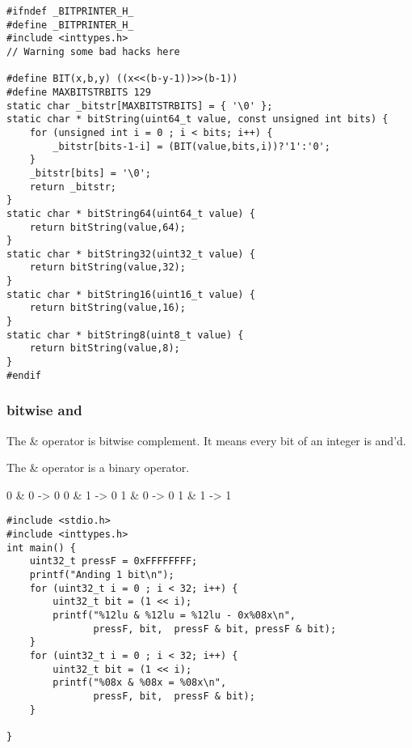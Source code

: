 \documentclass[11pt]{article}
\begin{document}
\begin{verbatim}
#ifndef _BITPRINTER_H_
#define _BITPRINTER_H_
#include <inttypes.h>
// Warning some bad hacks here

#define BIT(x,b,y) ((x<<(b-y-1))>>(b-1))
#define MAXBITSTRBITS 129
static char _bitstr[MAXBITSTRBITS] = { '\0' };
static char * bitString(uint64_t value, const unsigned int bits) {
    for (unsigned int i = 0 ; i < bits; i++) {
        _bitstr[bits-1-i] = (BIT(value,bits,i))?'1':'0';
    }
    _bitstr[bits] = '\0';
    return _bitstr;
}
static char * bitString64(uint64_t value) {
    return bitString(value,64);
}
static char * bitString32(uint32_t value) {
    return bitString(value,32);
}
static char * bitString16(uint16_t value) {
    return bitString(value,16);
}
static char * bitString8(uint8_t value) {
    return bitString(value,8);
}
#endif
\end{verbatim}

\subsubsection{bitwise and}
\label{sec:orgf372b5c}

The \& operator is bitwise complement. It means every bit of an integer
is and'd. 

The \& operator is a binary operator.

0 \& 0 -> 0
0 \& 1 -> 0
1 \& 0 -> 0
1 \& 1 -> 1

\begin{verbatim}
#include <stdio.h>
#include <inttypes.h>
int main() {  
    uint32_t pressF = 0xFFFFFFFF;
    printf("Anding 1 bit\n");
    for (uint32_t i = 0 ; i < 32; i++) {
        uint32_t bit = (1 << i);
        printf("%12lu & %12lu = %12lu - 0x%08x\n",  
               pressF, bit,  pressF & bit, pressF & bit);
    }
    for (uint32_t i = 0 ; i < 32; i++) {
        uint32_t bit = (1 << i);
        printf("%08x & %08x = %08x\n",
               pressF, bit,  pressF & bit);
    }

}
\end{verbatim}
\end{document}
